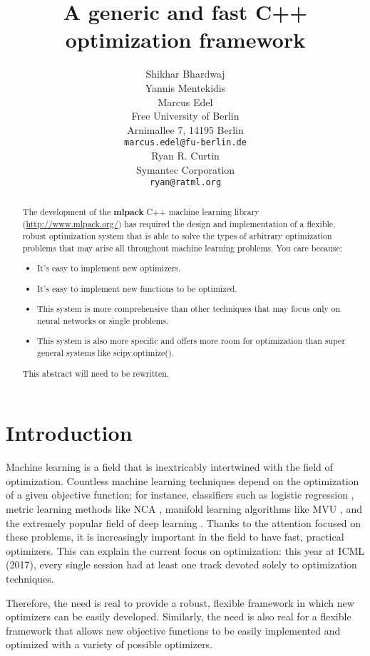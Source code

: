 \documentclass{article}
\title{A generic and fast C++ optimization framework}
\author{
  Shikhar Bhardwaj \\
  \AND
  Yannis Mentekidis \\
  \AND
  Marcus Edel \\
  Free University of Berlin \\
  Arnimallee 7, 14195 Berlin \\
  \texttt{marcus.edel@fu-berlin.de} \\
  \AND
  Ryan R. Curtin \\
  Symantec Corporation \\
  \texttt{ryan@ratml.org} \\
}
\begin{document}

\maketitle

\begin{abstract}
The development of the {\bf mlpack} C++ machine learning library
(\url{http://www.mlpack.org/}) has required the design and implementation of a
flexible, robust optimization system that is able to solve the types of
arbitrary optimization problems that may arise all throughout machine learning
problems.  You care because:

\begin{itemize}
  \item It's easy to implement new optimizers.
  \item It's easy to implement new functions to be optimized.
  \item This system is more comprehensive than other techniques that may focus
only on neural networks or single problems.
  \item This system is also more specific and offers more room for optimization
than super general systems like scipy.optimize().
\end{itemize}

This abstract will need to be rewritten.
\end{abstract}

\section{Introduction}

Machine learning is a field that is inextricably intertwined with the field of
optimization.  Countless machine learning techniques depend on the optimization
of a given objective function; for instance, classifiers such as logistic
regression \cite{cox1958regression}, metric learning methods like NCA
\cite{goldberger2005neighbourhood}, manifold learning algorithms like MVU
\cite{weinberger2006introduction}, and the extremely popular field of deep
learning \cite{schmidhuber2015deep}.  Thanks to the attention focused on these
problems, it is increasingly important in the field to have fast, practical
optimizers.  This can explain the current focus on optimization: this year at
ICML (2017), every single session had at least one track devoted solely to
optimization techniques.

Therefore, the need is real to provide a robust, flexible framework in which
new optimizers can be easily developed.  Similarly, the need is also real for a
flexible framework that allows new objective functions to be easily implemented
and optimized with a variety of possible optimizers.
\end{document}

